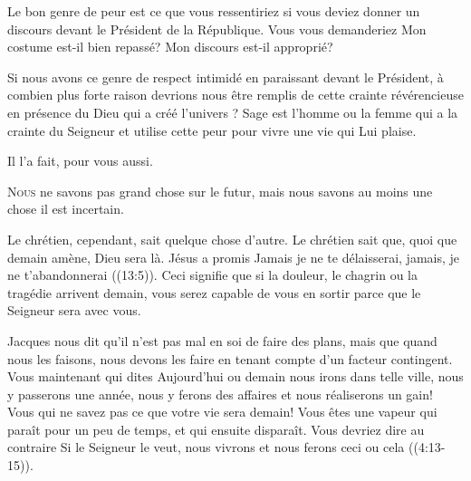Le bon genre de peur est ce que vous ressentiriez si vous deviez donner
 un discours devant le Président de la République.
 Vous vous demanderiez\frcolon{} 
 \Og Mon costume est-il bien repassé? 
 Mon discours est-il approprié? \Fg{}

Si nous avons ce genre de respect intimidé en paraissant devant le Président,
 à combien plus forte raison devrions nous être remplis de cette crainte
 révérencieuse en présence du Dieu qui a créé l'univers ?
 Sage est l'homme ou la femme qui a la crainte du Seigneur
 \ocadr et utilise cette peur pour vivre une vie qui Lui plaise. 

Il l'a fait, pour vous aussi.

\dvrule







\lettrine{N}{ous} ne savons pas grand chose sur le futur,
 mais nous savons au moins une chose\frcolon{} il est incertain. 

Le chrétien, cependant, sait quelque chose d'autre.
 Le chrétien sait que, quoi que demain amène, Dieu sera là.
 Jésus a promis\frcolon{}
 \Og Jamais je ne te délaisserai, jamais, je ne t'abandonnerai \Fg{}
 ((13:5)).
 Ceci signifie que si la douleur, le chagrin ou la tragédie arrivent 
 demain, vous serez capable de vous en sortir
 parce que le Seigneur sera avec vous. 


Jacques nous dit qu'il n'est pas mal en soi de faire des plans,
 mais que quand nous les faisons, nous devons les faire en tenant compte
 d'un facteur contingent.
 \Og Vous maintenant qui dites\frcolon{} Aujourd'hui ou demain nous irons
 dans telle ville, nous y passerons une année, nous y ferons des affaires
 et nous réaliserons un gain! Vous qui ne savez pas ce que votre vie
 sera demain! Vous êtes une vapeur qui paraît pour un peu de temps,
 et qui ensuite disparaît.
 Vous devriez dire au contraire\frcolon{} Si le Seigneur le veut,
 nous vivrons et nous ferons ceci ou cela \Fg{} ((4:13-15)). 

